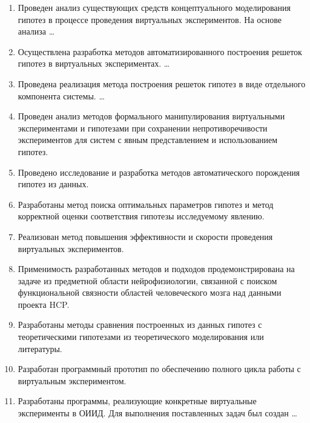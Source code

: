 \begin{enumerate}
  \item Проведен анализ существующих средств концептуального моделирования гипотез в процессе проведения виртуальных экспериментов. На основе анализа \ldots
  \item Осуществлена разработка методов автоматизированного построения решеток гипотез в виртуальных экспериментах. \ldots
  \item Проведена реализация метода построения решеток гипотез в виде отдельного компонента системы. \ldots
  \item Проведен анализ методов формального манипулирования виртуальными экспериментами и гипотезами при сохранении непротиворечивости экспериментов для систем с явным представлением и использованием гипотез.
  \item Проведено исследование и разработка методов автоматического порождения гипотез из данных.
  \item Разработаны метод поиска оптимальных параметров гипотез и метод корректной оценки соответствия гипотезы исследуемому явлению.
  \item Реализован метод повышения эффективности и скорости проведения виртуальных экспериментов.
  \item Применимость разработанных методов и подходов продемонстрирована на задаче из предметной области нейрофизиологии, связанной с поиском функциональной связности областей человеческого мозга над данными проекта HCP.
  \item Разработаны методы сравнения построенных из данных гипотез с теоретическими гипотезами из теоретического моделирования или литературы.
  \item Разработан программный прототип по обеспечению полного цикла работы с виртуальным экспериментом.
  
  \item Разработаны программы, реализующие конкретные виртуальные эксперименты в ОИИД. Для выполнения поставленных задач был создан \ldots
\end{enumerate}


